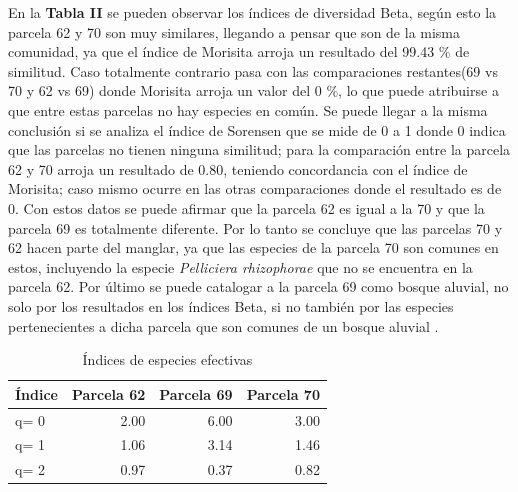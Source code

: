 \documentclass[conference,final,12pt,]{IEEEtran}
\begin{document}
En la \textbf{Tabla II} se pueden observar los índices de diversidad
Beta, según esto la parcela 62 y 70 son muy similares, llegando a pensar
que son de la misma comunidad, ya que el índice de Morisita arroja un
resultado del 99.43 \(\%\) de similitud. Caso totalmente contrario pasa con
las comparaciones restantes(69 vs 70 y 62 vs 69) donde Morisita arroja
un valor del 0 \(\%\), lo que puede atribuirse a que entre
estas parcelas no hay especies en común. Se puede llegar a la misma
conclusión si se analiza el índice de Sorensen que se mide de 0 a 1
donde 0 indica que las parcelas no tienen ninguna similitud; para la
comparación entre la parcela 62 y 70 arroja un resultado de 0.80,
teniendo concordancia con el índice de Morisita; caso mismo ocurre en
las otras comparaciones donde el resultado es de 0. Con estos datos se
puede afirmar que la parcela 62 es igual a la 70 y que la parcela 69 es
totalmente diferente. Por lo tanto se concluye que las parcelas
70 y 62 hacen parte del manglar, ya que las
especies de la parcela 70 son comunes en estos,
incluyendo la especie \emph{Pelliciera rhizophorae} \citep{Y} que no se
encuentra en la parcela 62. Por último se puede catalogar a la parcela
69 como bosque aluvial, no solo por los resultados en los índices Beta,
si no también por las especies pertenecientes a dicha parcela que son
comunes de un bosque aluvial \citep{Y}.

\begin{table}[htb]

\caption{\label{tab:unnamed-chunk-4}Índices de especies efectivas}
\centering
\begin{tabular}[t]{l|r|r|r}
\hline
Índice & Parcela 62 & Parcela 69 & Parcela 70\\
\hline
q= 0 & 2.00 & 6.00 & 3.00\\
\hline
q= 1 & 1.06 & 3.14 & 1.46\\
\hline
q= 2 & 0.97 & 0.37 & 0.82\\
\hline
\end{tabular}
\end{table}
\end{document}
